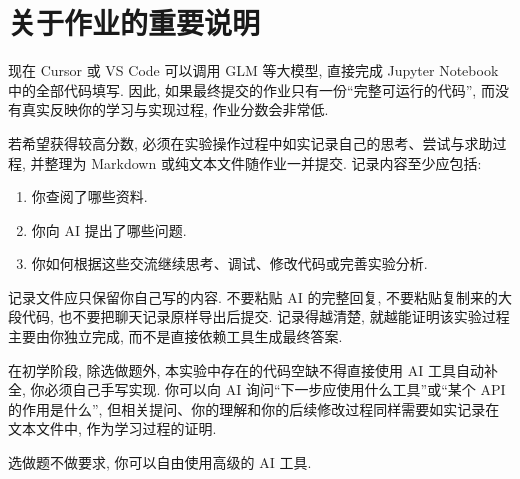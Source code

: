 \documentclass{../../nndlcourse}
\begin{document}
\section{关于作业的重要说明}

现在 Cursor 或 VS Code 可以调用 GLM 等大模型, 直接完成 Jupyter Notebook 中的全部代码填写. 因此, 如果最终提交的作业只有一份``完整可运行的代码'', 而没有真实反映你的学习与实现过程, 作业分数会非常低.

若希望获得较高分数, 必须在实验操作过程中如实记录自己的思考、尝试与求助过程, 并整理为 Markdown 或纯文本文件随作业一并提交. 记录内容至少应包括:

\begin{enumerate}
    \item 你查阅了哪些资料.
    \item 你向 AI 提出了哪些问题.
    \item 你如何根据这些交流继续思考、调试、修改代码或完善实验分析.
\end{enumerate}

记录文件应只保留你自己写的内容. 不要粘贴 AI 的完整回复, 不要粘贴复制来的大段代码, 也不要把聊天记录原样导出后提交. 记录得越清楚, 就越能证明该实验过程主要由你独立完成, 而不是直接依赖工具生成最终答案.

在初学阶段, 除选做题外, 本实验中存在的代码空缺不得直接使用 AI 工具自动补全, 你必须自己手写实现. 你可以向 AI 询问``下一步应使用什么工具''或``某个 API 的作用是什么'', 但相关提问、你的理解和你的后续修改过程同样需要如实记录在文本文件中, 作为学习过程的证明.

选做题不做要求, 你可以自由使用高级的 AI 工具. 
\end{document}
